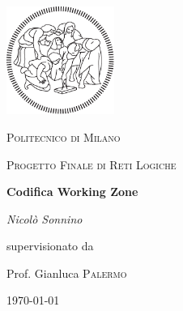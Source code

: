 \documentclass[12pt,a4paper]{report}
\begin{document}
\begin{titlepage}
    \centering
    \includegraphics[width=100pt]{logo-polimi-new}\par\vspace{1cm}
    {\scshape\LARGE Politecnico di Milano \par}
    \vspace{1cm}
    {\scshape\Large Progetto Finale di Reti Logiche \par}
    \vspace{1.5cm}
    {\huge\bfseries Codifica Working Zone\par}
    \vspace{2cm}
    {\Large\itshape Nicolò Sonnino\par}
    \vfill
    supervisionato da\par
    Prof. Gianluca \textsc{Palermo}
    \vfill
    {\large \today \par}
\end{titlepage}
\end{document}

